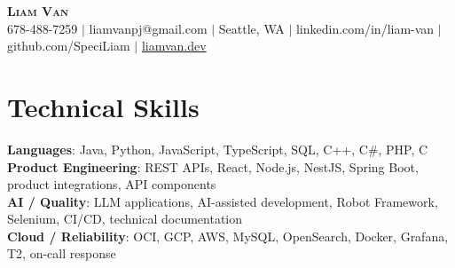 \documentclass[letterpaper,11pt]{article}
\begin{document}

%
\begin{center}
    \textbf{\Huge \scshape Liam Van} \\ \vspace{1pt}
    \small 678-488-7259 $|$ \small {liamvanpj@gmail.com} $|$ Seattle, WA
 {{$|$ linkedin.com/in/liam-van} {$|$ github.com/SpeciLiam} {$|$ \href{https://liamvan.dev}{liamvan.dev}}}

\end{center}

\section{Technical Skills}
 \begin{itemize}[leftmargin=0.15in, label={}]
    \small{\item{
     \textbf{Languages}{: Java, Python, JavaScript, TypeScript, SQL, C++, C\#, PHP, C} \\
     \textbf{Product Engineering}{: REST APIs, React, Node.js, NestJS, Spring Boot, product integrations, API components} \\
     \textbf{AI / Quality}{: LLM applications, AI-assisted development, Robot Framework, Selenium, CI/CD, technical documentation} \\
     \textbf{Cloud / Reliability}{: OCI, GCP, AWS, MySQL, OpenSearch, Docker, Grafana, T2, on-call response} \\
    }}
 \end{itemize}
%

\end{document}
